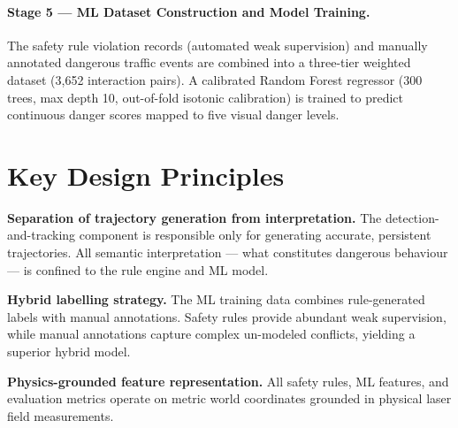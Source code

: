 \paragraph{Stage 5 — ML Dataset Construction and Model Training.}
The safety rule violation records (automated weak supervision) and manually annotated dangerous traffic events are combined into a three-tier weighted dataset (3,652 interaction pairs). A calibrated Random Forest regressor (300 trees, max depth 10, out-of-fold isotonic calibration) is trained to predict continuous danger scores mapped to five visual danger levels.

\section{Key Design Principles}

\textbf{Separation of trajectory generation from interpretation.}
The detection-and-tracking component is responsible only for generating accurate, persistent trajectories. All semantic interpretation --- what constitutes dangerous behaviour --- is confined to the rule engine and ML model.

\textbf{Hybrid labelling strategy.}
The ML training data combines rule-generated labels with manual annotations. Safety rules provide abundant weak supervision, while manual annotations capture complex un-modeled conflicts, yielding a superior hybrid model.

\textbf{Physics-grounded feature representation.}
All safety rules, ML features, and evaluation metrics operate on metric world coordinates grounded in physical laser field measurements.